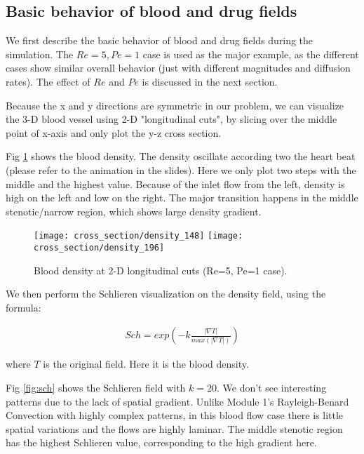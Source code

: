 \graphicspath{ {./JiaweiZhuang/img/} }

\subsection{Basic behavior of blood and drug fields}

We first describe the basic behavior of blood and drug fields during the simulation. The $Re=5, Pe=1$ case is used as the major example, as the different cases show similar overall behavior (just with different magnitudes and diffusion rates). The effect of $Re$ and $Pe$ is discussed in the next section.

Because the x and y directions are symmetric in our problem, we can visualize the 3-D blood vessel using 2-D "longitudinal cuts", by slicing over the middle point of x-axis and only plot the y-z cross section. 

Fig \ref{fig:density} shows the blood density. The density oscillate according two the heart beat (please refer to the animation in the slides). Here we only plot two steps with the middle and the highest value. Because of the inlet flow from the left, density is high on the left and low on the right. The major transition happens in the middle stenotic/narrow region, which shows large density gradient.

\begin{figure}[H]
\texttt{[image: cross\_section/density\_148]}
\texttt{[image: cross\_section/density\_196]}
\centering
\caption{Blood density at 2-D longitudinal cuts (Re=5, Pe=1 case).}
\label{fig:density}
\end{figure}

We then perform the Schlieren visualization on the density field, using the formula:

\begin{align}
Sch = exp(-k\frac{|\nabla T|}{max(|\nabla T|)})
\end{align}

where $T$ is the original field. Here it is the blood density.

Fig \ref{fig:sch} shows the Schlieren field with $k=20$. We don't see interesting patterns due to the lack of spatial gradient. Unlike Module 1’s Rayleigh-Benard Convection with highly complex patterns, in this blood flow case there is little spatial variations and the flows are highly laminar. The middle stenotic region has the highest Schlieren value, corresponding to the high gradient here.

